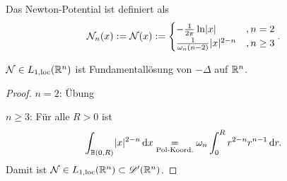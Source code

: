 \begin{defi}
  Das Newton-Potential ist definiert als
  \[
  \mathcal{N}_n(x):=\mathcal{N}(x):=\begin{cases}
    -\frac 1{2\pi}\ln\lvert x\rvert &, n=2 \\
    \frac 1{\omega_n(n-2)}\lvert x\rvert^{2-n} &, n\geq 3
  \end{cases}.
  \]
\end{defi}

\begin{theorem}
  \label{theorem:4.4}
  $\mathcal{N}\in L_{1,\scriptsize{\textnormal{loc}}}(\mathbb{R}^n)$ ist Fundamentallösung von $-\Delta$ auf $\mathbb{R}^n$.
\end{theorem}

\begin{proof}
  $n=2$: Übung

  $n\geq3$: Für alle $R>0$ ist
  \[
  \int_{\mathbb{B}(0,R)}\lvert x\rvert^{2-n}\,\mathrm{d} x\underset{\scriptsize\text{Pol-Koord.}}=
  \omega_n\int_0^Rr^{2-n}r^{n-1}\,\mathrm{d} r.
  \]
  Damit ist $\mathcal{N}\in L_{1,\scriptsize{\textnormal{loc}}}(\mathbb{R}^n)\subset\mathscr{D}'(\mathbb{R}^n)$.


\end{proof}
